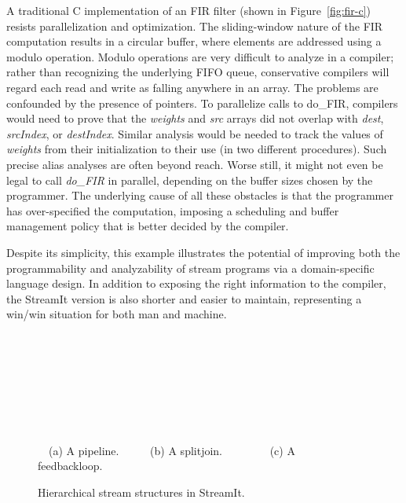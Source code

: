 A traditional C implementation of an FIR filter (shown in
Figure~\ref{fig:fir-c}) resists parallelization and optimization.  The
sliding-window nature of the FIR computation results in a circular
buffer, where elements are addressed using a modulo operation.  Modulo
operations are very difficult to analyze in a compiler; rather than
recognizing the underlying FIFO queue, conservative compilers will
regard each read and write as falling anywhere in an array.  The
problems are confounded by the presence of pointers.  To parallelize
calls to do\_FIR, compilers would need to prove that the {\it weights}
and {\it src} arrays did not overlap with {\it dest}, {\it srcIndex},
or {\it destIndex}.  Similar analysis would be needed to track the
values of {\it weights} from their initialization to their use (in two
different procedures).  Such precise alias analyses are often beyond
reach.  Worse still, it might not even be legal to call {\it do\_FIR}
in parallel, depending on the buffer sizes chosen by the programmer.
The underlying cause of all these obstacles is that the programmer has
over-specified the computation, imposing a scheduling and buffer
management policy that is better decided by the compiler.

Despite its simplicity, this example illustrates the potential of
improving both the programmability and analyzability of stream
programs via a domain-specific language design.  In addition to
exposing the right information to the compiler, the StreamIt version
is also shorter and easier to maintain, representing a win/win
situation for both man and machine.

\begin{figure}[t]
\centering
\begin{minipage}{0.46in}
{\centering
{} \\
}
\end{minipage} 
\hspace{0.15in}
\begin{minipage}{1.3in}
{\centering
{} \\
}
\end{minipage}
\hspace{0.15in}
\begin{minipage}{1.02in}
{\centering
{} \\
}
\end{minipage}
\\ ~ \\ {\mbox{~}\protect\small \mbox{~}(a) A pipeline. ~~~~~(b) A splitjoin. ~~~~~~~~(c) A feedbackloop.~~~~~}
\caption{Hierarchical stream structures in StreamIt.\protect\label{fig:structures}}
\end{figure}

